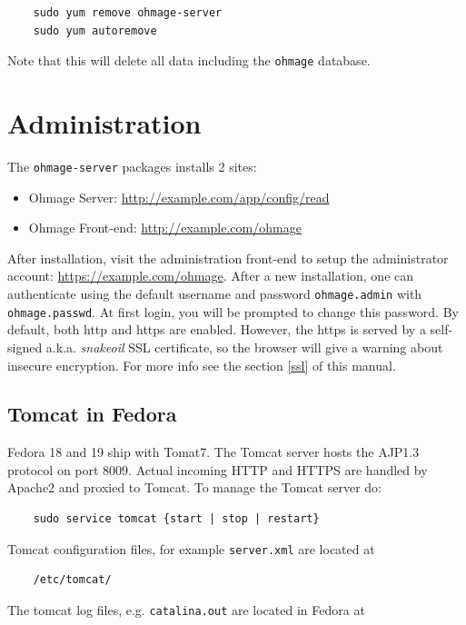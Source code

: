 \documentclass{scrartcl}
\begin{document}
\begin{verbatim}
    sudo yum remove ohmage-server
    sudo yum autoremove
\end{verbatim}
Note that this will delete all data including the \texttt{ohmage} database.

\section{Administration}

The \texttt{ohmage-server} packages installs 2 sites:

\begin{itemize}
  \item Ohmage Server: \url{http://example.com/app/config/read}
  \item Ohmage Front-end: \url{http://example.com/ohmage}
\end{itemize}

\noindent After installation, visit the administration front-end to setup the
administrator account: \url{https://example.com/ohmage}. After a new
installation, one can authenticate using the default username and password
\texttt{ohmage.admin} with \texttt{ohmage.passwd}. At first login, you will be
prompted to change this password. By default, both http and https are enabled.
However, the https is served by a self-signed a.k.a. \emph{snakeoil} SSL
certificate, so the browser will give a warning about insecure encryption.
For more info see the section \ref{ssl} of this manual.

\subsection{Tomcat in Fedora}

Fedora 18 and 19 ship with Tomat7. The Tomcat server hosts the AJP1.3 protocol
on port 8009. Actual incoming HTTP and HTTPS are handled by Apache2 and proxied
to Tomcat. To manage the Tomcat server do:

\begin{verbatim}
    sudo service tomcat {start | stop | restart}
\end{verbatim}

Tomcat configuration files, for example \texttt{server.xml} are located at

\begin{verbatim}
    /etc/tomcat/
\end{verbatim}

The tomcat log files, e.g. \texttt{catalina.out} are located in Fedora at
\end{document}
